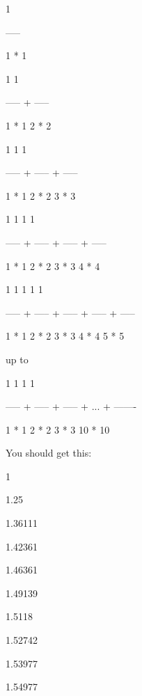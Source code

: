 \begin{console}

  1

-----

1 * 1



  1       1

----- + -----

1 * 1   2 * 2



  1       1       1

----- + ----- + -----

1 * 1   2 * 2   3 * 3



1         1       1       1

----- + ----- + ----- + -----

1 * 1   2 * 2   3 * 3   4 * 4



  1       1       1       1       1

----- + ----- + ----- + ----- + -----

1 * 1   2 * 2   3 * 3   4 * 4   5 * 5



up to



  1       1       1              1

----- + ----- + ----- + ... + -------

1 * 1   2 * 2   3 * 3         10 * 10

\end{console}

You should get this:



\begin{console}

1

1.25

1.36111

1.42361

1.46361

1.49139

1.5118

1.52742

1.53977

1.54977 

\end{console}

